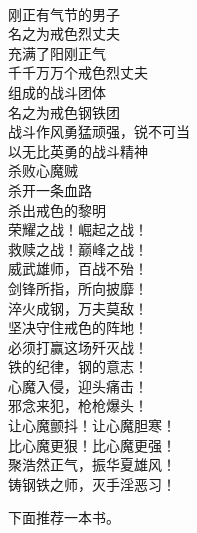 \begin{poem}[戒色烈丈夫]
    \begin{multicols}{3}
        \centering~\\
        刚正有气节的男子 \\ 名之为戒色烈丈夫 \\ 充满了阳刚正气 \\ 千千万万个戒色烈丈夫 \\ 组成的战斗团体 \\ 名之为戒色钢铁团 \\ 战斗作风勇猛顽强，锐不可当 \\ 以无比英勇的战斗精神 \\ 杀败心魔贼 \\ 杀开一条血路 \\ 杀出戒色的黎明 \\ 荣耀之战！崛起之战！ \\ 救赎之战！巅峰之战！ \\ 威武雄师，百战不殆！ \\ 剑锋所指，所向披靡！ \\ 淬火成钢，万夫莫敌！ \\ 坚决守住戒色的阵地！ \\ 必须打赢这场歼灭战！ \\ 铁的纪律，钢的意志！ \\ 心魔入侵，迎头痛击！ \\ 邪念来犯，枪枪爆头！ \\ 让心魔颤抖！让心魔胆寒！ \\ 比心魔更狠！比心魔更强！ \\ 聚浩然正气，振华夏雄风！ \\ 铸钢铁之师，灭手淫恶习！
    \end{multicols}
\end{poem}

下面推荐一本书。

